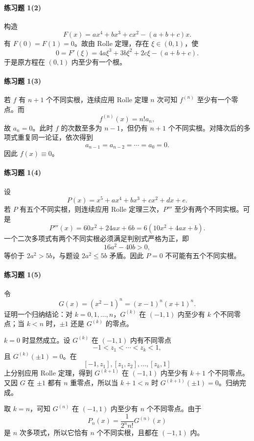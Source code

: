 \paragraph{练习题 1(2)}
\begin{xsolution}
构造
\[
  F(x)=ax^4+bx^3+cx^2-(a+b+c)x.
\]
有 $F(0)=F(1)=0$。故由 Rolle 定理，存在 $\xi\in(0,1)$，使
\[
  0=F'(\xi)=4a\xi^3+3b\xi^2+2c\xi-(a+b+c).
\]
于是原方程在 $(0,1)$ 内至少有一个根。
\end{xsolution}

\paragraph{练习题 1(3)}
\begin{xsolution}
若 $f$ 有 $n+1$ 个不同实根，连续应用 Rolle 定理 $n$ 次可知 $f^{(n)}$ 至少有一个零点。而
\[
  f^{(n)}(x)=n!a_n,
\]
故 $a_n=0$。此时 $f$ 的次数至多为 $n-1$，但仍有 $n+1$ 个不同实根。对降次后的多项式重复同一论证，依次得到
\[
  a_{n-1}=a_{n-2}=\cdots=a_0=0.
\]
因此 $f(x)\equiv0$。
\end{xsolution}

\paragraph{练习题 1(4)}
\begin{xsolution}
设
\[
  P(x)=x^5+ax^4+bx^3+cx^2+dx+e.
\]
若 $P$ 有五个不同实根，则连续应用 Rolle 定理三次，$P'''$ 至少有两个不同实根。可是
\[
  P'''(x)=60x^2+24ax+6b=6(10x^2+4ax+b).
\]
一个二次多项式有两个不同实根必须满足判别式严格为正，即
\[
  16a^2-40b>0,
\]
等价于 $2a^2>5b$，与题设 $2a^2\leqslant5b$ 矛盾。因此 $P=0$ 不可能有五个不同实根。
\end{xsolution}

\paragraph{练习题 1(5)}
\begin{xsolution}
令
\[
  G(x)=(x^2-1)^n=(x-1)^n(x+1)^n.
\]
证明一个归纳结论：对 $k=0,1,\ldots,n$，$G^{(k)}$ 在 $(-1,1)$ 内至少有 $k$ 个不同零点；当 $k<n$ 时，$\pm1$ 还是 $G^{(k)}$ 的零点。

$k=0$ 时显然成立。设 $G^{(k)}$ 在 $(-1,1)$ 内有不同零点
\[
  -1<z_1<\cdots<z_k<1,
\]
且 $G^{(k)}(\pm1)=0$。在
\[
  [-1,z_1],[z_1,z_2],\ldots,[z_k,1]
\]
上分别应用 Rolle 定理，得到 $G^{(k+1)}$ 在 $(-1,1)$ 内至少有 $k+1$ 个不同零点。又因 $G$ 在 $\pm1$ 都有 $n$ 重零点，所以当 $k+1<n$ 时 $G^{(k+1)}(\pm1)=0$。归纳完成。

取 $k=n$，可知 $G^{(n)}$ 在 $(-1,1)$ 内至少有 $n$ 个不同零点。由于
\[
  P_n(x)=\frac{1}{2^n n!}G^{(n)}(x)
\]
是 $n$ 次多项式，所以它恰有 $n$ 个不同实根，且都在 $(-1,1)$ 内。
\end{xsolution}

